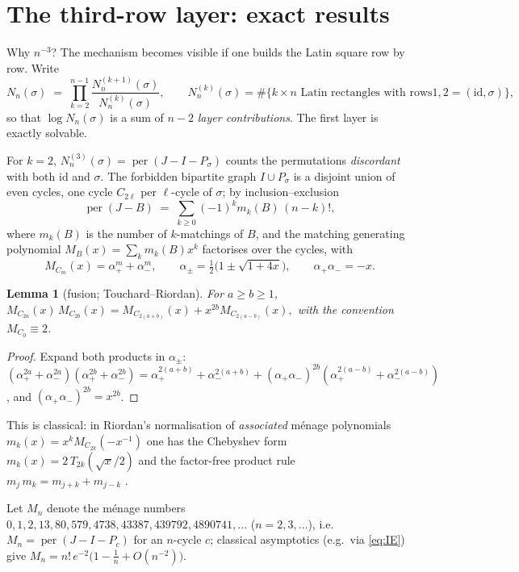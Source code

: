 \documentclass[11pt]{article}
\newtheorem{lemma}[theorem]{Lemma}
\theoremstyle{definition}
\DeclareMathOperator{\per}{per}
\begin{document}
\section{The third-row layer: exact results}\label{sec:thirdrow}

Why $n^{-3}$?  The mechanism becomes visible if one builds the Latin square
row by row.  Write
\[
N_n(\sigma)\;=\;\prod_{k=2}^{n-1}\frac{N^{(k+1)}_n(\sigma)}{N^{(k)}_n(\sigma)},
\qquad
N^{(k)}_n(\sigma)=\#\{k\times n \text{ Latin rectangles with rows
}1,2=(\mathrm{id},\sigma)\},
\]
so that $\log N_n(\sigma)$ is a sum of $n-2$ \emph{layer contributions}.  The
first layer is exactly solvable.

For $k=2$, $N^{(3)}_n(\sigma)=\per(J-I-P_\sigma)$ counts the permutations
\emph{discordant} with both $\mathrm{id}$ and $\sigma$.  The forbidden
bipartite graph $I\cup P_\sigma$ is a disjoint union of even cycles, one
cycle $C_{2\ell}$ per $\ell$-cycle of $\sigma$; by inclusion--exclusion
\begin{equation}\label{eq:IE}
\per(J-B)\;=\;\sum_{k\ge0}(-1)^k m_k(B)\,(n-k)!,
\end{equation}
where $m_k(B)$ is the number of $k$-matchings of $B$, and the matching
generating polynomial $M_B(x)=\sum_k m_k(B)x^k$ factorises over the cycles,
with
\[
M_{C_m}(x)=\alpha_+^m+\alpha_-^m,\qquad
\alpha_\pm=\tfrac12\bigl(1\pm\sqrt{1+4x}\bigr),\qquad
\alpha_+\alpha_-=-x .
\]

\begin{lemma}[fusion; Touchard--Riordan]\label{lem:fusion}
For $a\ge b\ge1$,
\(
M_{C_{2a}}(x)\,M_{C_{2b}}(x)=M_{C_{2(a+b)}}(x)+x^{2b}M_{C_{2(a-b)}}(x),
\)
with the convention $M_{C_0}\equiv2$.
\end{lemma}

\begin{proof}
Expand both products in $\alpha_\pm$:
$(\alpha_+^{2a}+\alpha_-^{2a})(\alpha_+^{2b}+\alpha_-^{2b})
=\alpha_+^{2(a+b)}+\alpha_-^{2(a+b)}
+(\alpha_+\alpha_-)^{2b}(\alpha_+^{2(a-b)}+\alpha_-^{2(a-b)})$,
and $(\alpha_+\alpha_-)^{2b}=x^{2b}$.
\end{proof}

This is classical: in Riordan's normalisation of \emph{associated} m\'enage
polynomials $m_k(x)=x^kM_{C_{2k}}(-x^{-1})$ one has the Chebyshev form
$m_k(x)=2\,T_{2k}(\sqrt x/2)$ and the factor-free product rule
$m_j\,m_k=m_{j+k}+m_{j-k}$
\cite[Ch.~8, eqs.~(24)--(25)]{Riordan58}.

Let $M_n$ denote the m\'enage numbers
$0,1,2,13,80,579,4738,43387,439792,4890741,\dots$ ($n=2,3,\dots$), i.e.\
$M_n=\per(J-I-P_{c})$ for an $n$-cycle $c$; classical asymptotics
(e.g.\ via \eqref{eq:IE}) give $M_n=n!\,e^{-2}\bigl(1-\tfrac1n+O(n^{-2})\bigr)$.
\end{document}
